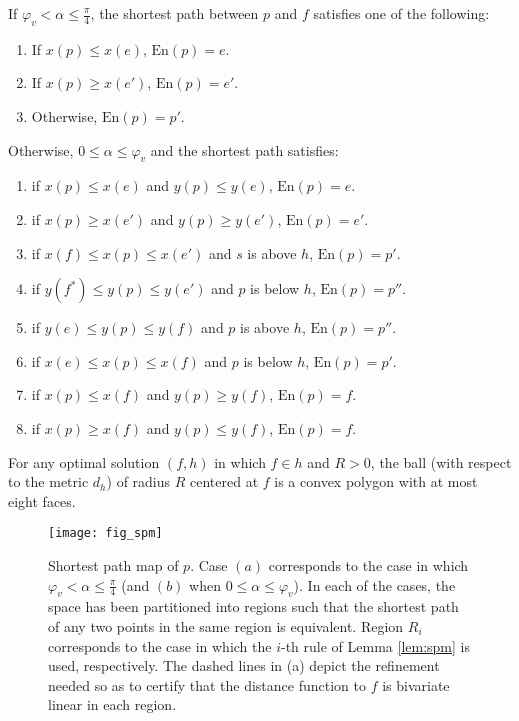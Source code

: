\documentclass{llncs}
\newcommand{\entry}{\mathrm{En}}
\begin{document}
\begin{lemma}\label{lem:spm}\cite{bklv-lsfrtlovl-11}
If $\varphi_v<\alpha\leq\frac{\pi}{4}$, the shortest path between $p$ and $f$ satisfies one of the following:
\begin{enumerate}
\item If $x(p)\leq x(e)$,  $\entry(p)=e$.
\item If $x(p)\geq x(e')$, $\entry(p)=e'$.
\item Otherwise, $\entry(p)=p'$.
\end{enumerate}
Otherwise,  $0\leq\alpha\leq\varphi_v$ and the shortest path satisfies:
\begin{enumerate}
\item if $x(p)\leq x(e)$ and $y(p)\leq y(e)$, $\entry(p)=e$.
\item if $x(p)\geq x(e')$ and $y(p)\geq y(e')$, $\entry(p)=e'$.
\item if $x(f)\leq x(p)\leq x(e')$ and $s$ is above $h$, $\entry(p)=p'$.
\item if $y(f^*)\leq y(p)\leq y(e')$ and $p$ is below $h$, $\entry(p)=p''$.
\item if $y(e)\leq y(p)\leq y(f)$ and $p$ is above $h$, $\entry(p)=p''$.
\item if $x(e)\leq x(p)\leq x(f)$ and $p$ is below $h$, $\entry(p)=p'$.
\item if $x(p)\leq x(f)$ and $y(p)\geq y(f)$, $\entry(p)=f$.
\item if $x(p)\geq x(f)$ and $y(p)\leq y(f)$, $\entry(p)=f$.
\end{enumerate}
\end{lemma}
\begin{corollary}\label{cor_convex}
For any optimal solution $(f,h)$ in which $f\in h$ and $R>0$, the ball (with respect to the metric $d_h$) of radius $R$  centered at $f$  is a convex polygon with at most eight faces.
\end{corollary}
\begin{figure}
\centering
\texttt{[image: fig\_spm]}
\caption{Shortest path map of $p$. Case $(a)$ corresponds to the case in which $\varphi_v<\alpha\leq\frac{\pi}{4}$ (and $(b)$ when $0\leq\alpha\leq\varphi_v$). In each of the cases, the space has been partitioned into regions such that the shortest path of any two points in the same region is equivalent. Region $R_i$ corresponds to the case in which the $i$-th rule of Lemma \ref{lem:spm} is used, respectively. The dashed lines in (a) depict the refinement needed so as to certify that the distance function to $f$ is bivariate linear in each region.}
\label{fig_spm}
\end{figure}
\end{document}
